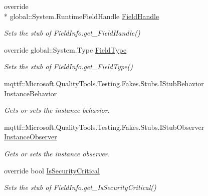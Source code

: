 \begin{DoxyCompactItemize}
override \\*
global\-::\-System.\-Runtime\-Field\-Handle \hyperlink{class_system_1_1_reflection_1_1_fakes_1_1_stub_field_info_ab1dea680d27aa215adea697c3f34c191}{Field\-Handle}
\begin{DoxyCompactList}\small\item\em Sets the stub of Field\-Info.\-get\-\_\-\-Field\-Handle()\end{DoxyCompactList}\item 
override global\-::\-System.\-Type \hyperlink{class_system_1_1_reflection_1_1_fakes_1_1_stub_field_info_afca4904abed8a1e55f51ec9916ee518b}{Field\-Type}
\begin{DoxyCompactList}\small\item\em Sets the stub of Field\-Info.\-get\-\_\-\-Field\-Type()\end{DoxyCompactList}\item 
mqttf\-::\-Microsoft.\-Quality\-Tools.\-Testing.\-Fakes.\-Stubs.\-I\-Stub\-Behavior \hyperlink{class_system_1_1_reflection_1_1_fakes_1_1_stub_field_info_a0f1cf8e8a06781802dac06a3578b85e5}{Instance\-Behavior}
\begin{DoxyCompactList}\small\item\em Gets or sets the instance behavior.\end{DoxyCompactList}\item 
mqttf\-::\-Microsoft.\-Quality\-Tools.\-Testing.\-Fakes.\-Stubs.\-I\-Stub\-Observer \hyperlink{class_system_1_1_reflection_1_1_fakes_1_1_stub_field_info_aa4e27827b97bc1425b3bf2320a314b49}{Instance\-Observer}
\begin{DoxyCompactList}\small\item\em Gets or sets the instance observer.\end{DoxyCompactList}\item 
override bool \hyperlink{class_system_1_1_reflection_1_1_fakes_1_1_stub_field_info_a1346dbd154ac02c5a16c2ae79fa0320c}{Is\-Security\-Critical}
\begin{DoxyCompactList}\small\item\em Sets the stub of Field\-Info.\-get\-\_\-\-Is\-Security\-Critical()\end{DoxyCompactList}\item 

\end{DoxyCompactItemize}
